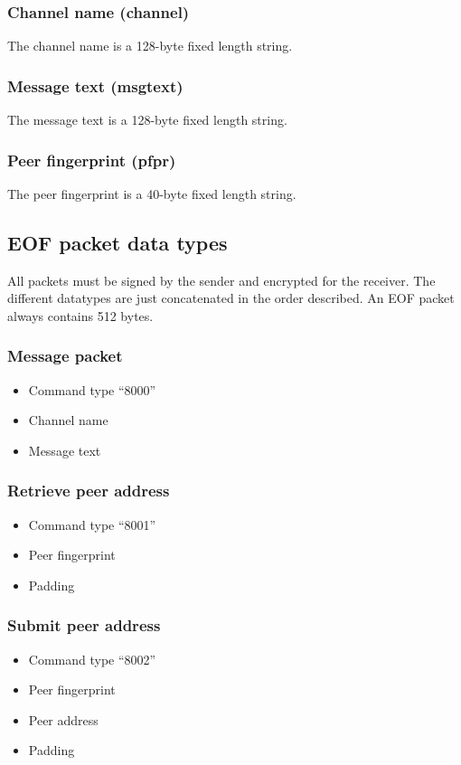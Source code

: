 \documentclass[12pt,a4paper]{book}
\begin{document}
\subsubsection{Channel name (channel)}
The channel name is a 128-byte fixed length string.
\subsubsection{Message text (msgtext)}
The message text is a 128-byte fixed length string.
\subsubsection{Peer fingerprint (pfpr)}
The peer fingerprint is a 40-byte fixed length string.
\subsection{EOF packet data types}
All packets must be signed by the sender and encrypted for the receiver.
The different datatypes are just concatenated in the order
described.
An EOF packet always contains 512 bytes.
\subsubsection{Message packet}
\begin{itemize}
\item Command type "`8000"'
\item Channel name
\item Message text
\end{itemize}
\subsubsection{Retrieve peer address}
\begin{itemize}
\item Command type "`8001"'
\item Peer fingerprint
\item Padding
\end{itemize}
\subsubsection{Submit peer address}
\begin{itemize}
\item Command type "`8002"'
\item Peer fingerprint
\item Peer address
\item Padding
\end{itemize}
\end{document}
